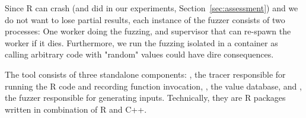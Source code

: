 \documentclass[sigplan,anonymous,review]{acmart}
\begin{document}

Since R can crash (and did in our experiments, \Cf Section~\ref{sec:assessment}) and we do not want to lose partial results, each instance of the fuzzer consists of two processes:
One worker doing the fuzzing, and supervisor that can re-spawn the worker if it dies.
Furthermore, we run the fuzzing isolated in a container as calling arbitrary code with "random" values could have dire consequences.

The tool consists of three standalone components: , the tracer responsible for running the R code and recording function invocation, , the value database, and , the fuzzer responsible for generating inputs.
Technically, they are R packages written in combination of R and C++.
\end{document}
